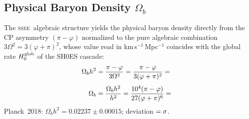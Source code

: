 \documentclass[12pt,a4paper]{article}
\newcommand{\SSEE}{\ifmmode\mathrm{SSEE}\else\textsc{ssee}\fi}
\begin{document}
\subsection{Physical Baryon Density \texorpdfstring{$\Omega_b$}{Omega\_b}}
\label{sec:baryons}

The \SSEE\ algebraic structure yields the physical baryon density directly from
the CP asymmetry $(\pi-\varphi)$ normalized to the pure algebraic combination
$3\Omega^2 = 3(\varphi+\pi)^2$, whose value read in km\,s$^{-1}$\,Mpc$^{-1}$
coincides with the global rate $H_0^{\rm glob}$ of the SH0ES cascade:
\begin{align}
\Omega_b h^2 &= \frac{\pi-\varphi}{3\Omega^2} = \frac{\pi-\varphi}{3(\varphi+\pi)^2} = \val{OMEGA_B_H2_d6}
\label{eq:Obh2} \\[4pt]
\Omega_b     &= \frac{\Omega_b h^2}{h^2}
              = \frac{10^4(\pi-\varphi)}{27(\varphi+\pi)^6}
              = \val{Omega_b_alg_d5}
\label{eq:Ob}
\end{align}
Planck~2018: $\Omega_b h^2 = 0.02237\pm0.00015$; deviation $= \val{wb_planck_sig}\sigma$.
\end{document}
